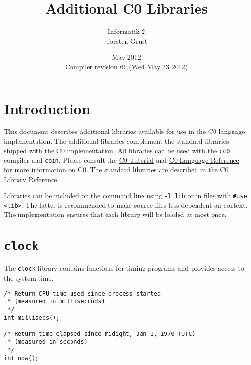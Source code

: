 \documentclass[11pt]{article}
\title{Additional C0 Libraries}
\author{Informatik 2 \\ Torsten Grust}
\date{May 2012\\Compiler revision 69 (Wed May 23 2012)}
\begin{document}
\maketitle

\section{Introduction}

This document describes additional libraries available for use in the
C0 language implementation. The additional libraries complement the
standard libraries shipped with the C0 implementation. All libraries
can be used with the \verb'cc0' compiler and \verb'coin'.  Please
consult the \href{http://c0.typesafety.net/tutorial}{C0 Tutorial} and
\href{http://c0.typesafety.net/doc/c0-reference.pdf}{C0 Language
  Reference} for more information on C0. The standard libraries are
described in the \href{http://c0.typesafety.net/tutorial}{C0 Library
  Reference}.

Libraries can be included on the command line using \verb'-l lib' or in
files with \verb'#use <lib>'.  The latter is recommended to make
source files less dependent on context.  The implementation ensures
that each library will be loaded at most once.

\section{\tt clock}
\label{sec:tt-clock}


The \verb'clock' library contains functions for timing programs and
provides access to the system time.

\begin{small}
\begin{verbatim}
/* Return CPU time used since process started
 * (measured in milliseconds)
 */
int millisecs();

/* Return time elapsed since midight, Jan 1, 1970 (UTC)
 * (measured in seconds)
 */
int now();
\end{verbatim}
\end{small}
\end{document}
